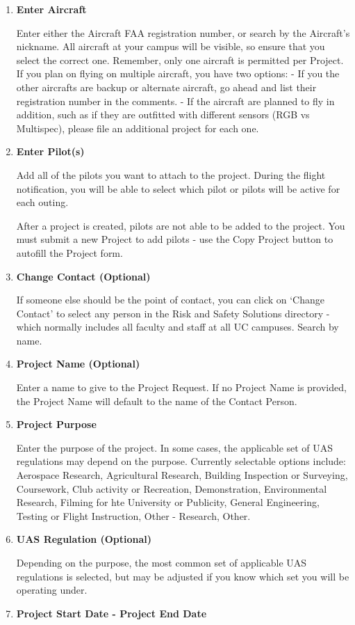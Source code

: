 \documentclass[
]{book}
\begin{document}
\begin{enumerate}
\def\labelenumi{\arabic{enumi}.}
\item
  \textbf{Enter Aircraft}

  Enter either the Aircraft FAA registration number, or search by the Aircraft's nickname. All aircraft at your campus will be visible, so ensure that you select the correct one. Remember, only one aircraft is permitted per Project. If you plan on flying on multiple aircraft, you have two options:
  - If you the other aircrafts are backup or alternate aircraft, go ahead and list their registration number in the comments.
  - If the aircraft are planned to fly in addition, such as if they are outfitted with different sensors (RGB vs Multispec), please file an additional project for each one.
\item
  \textbf{Enter Pilot(s)}

  Add all of the pilots you want to attach to the project. During the flight notification, you will be able to select which pilot or pilots will be active for each outing.

  After a project is created, pilots are not able to be added to the project. You must submit a new Project to add pilots - use the Copy Project button to autofill the Project form.
\item
  \textbf{Change Contact (Optional)}

  If someone else should be the point of contact, you can click on `Change Contact' to select any person in the Risk and Safety Solutions directory - which normally includes all faculty and staff at all UC campuses. Search by name.
\item
  \textbf{Project Name (Optional)}

  Enter a name to give to the Project Request. If no Project Name is provided, the Project Name will default to the name of the Contact Person.
\item
  \textbf{Project Purpose}

  Enter the purpose of the project. In some cases, the applicable set of UAS regulations may depend on the purpose. Currently selectable options include: Aerospace Research, Agricultural Research, Building Inspection or Surveying, Coursework, Club activity or Recreation, Demonstration, Environmental Research, Filming for hte University or Publicity, General Engineering, Testing or Flight Instruction, Other - Research, Other.
\item
  \textbf{UAS Regulation (Optional)}

  Depending on the purpose, the most common set of applicable UAS regulations is selected, but may be adjusted if you know which set you will be operating under.
\item
  \textbf{Project Start Date - Project End Date}


\end{enumerate}
\end{document}

